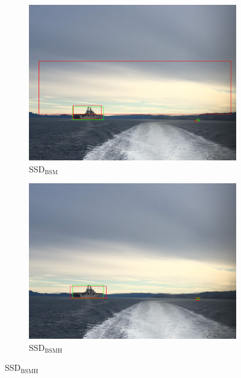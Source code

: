 \begin{figure}[h!]
\begin{subfigure}{.5\textwidth}
  \centering
  \includegraphics[width=0.75\linewidth]{results/case_buildings/ssdtrf/ssd2/grov2/IMG_2226.jpg}
  \caption{SSD$_{\text{BSM}}$}
\end{subfigure}%
\begin{subfigure}{.5\textwidth}
  \centering
  \includegraphics[width=.75\linewidth]{results/case_buildings/ssdtrf/ssd3/grov2/IMG_2226.jpg}
  \caption{SSD$_{\text{BSMH}}$}
\end{subfigure}


\end{figure}

